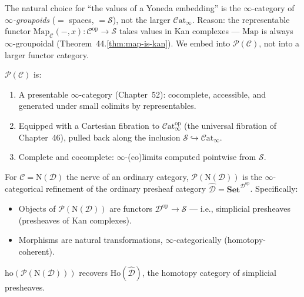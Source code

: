 \begin{remark}
\label{rem:why-spaces}
The natural choice for ``the values of a Yoneda embedding'' is the
$\infty$-category of \emph{$\infty$-groupoids} ($=$ spaces, $=
\mathcal{S}$), not the larger $\mathcal{C}\mathrm{at}_\infty$. Reason:
the representable functor $\mathrm{Map}_\mathcal{C}(-, x) :
\mathcal{C}^{\mathrm{op}} \to \mathcal{S}$ takes values in Kan complexes
— $\mathrm{Map}$ is always $\infty$-groupoidal (Theorem~44.\ref{thm:map-is-kan}).
We embed into $\mathcal{P}(\mathcal{C})$, not into a larger functor
category.
\end{remark}

\begin{theorem}
\label{thm:presheaves-properties}
$\mathcal{P}(\mathcal{C})$ is:
\begin{enumerate}
  \item A presentable $\infty$-category (Chapter~52): cocomplete,
        accessible, and generated under small colimits by representables.
  \item Equipped with a Cartesian fibration to $\mathcal{C}\mathrm{at}_\infty^{\mathrm{op}}$
        (the universal fibration of Chapter~46), pulled back along the
        inclusion $\mathcal{S} \hookrightarrow \mathcal{C}\mathrm{at}_\infty$.
  \item Complete and cocomplete: $\infty$-(co)limits computed pointwise
        from $\mathcal{S}$.
\end{enumerate}
\end{theorem}

\begin{example_thm}
\label{ex:presheaves-1cat}
For $\mathcal{C} = \mathrm{N}(\mathcal{D})$ the nerve of an ordinary
category, $\mathcal{P}(\mathrm{N}(\mathcal{D}))$ is the
$\infty$-categorical refinement of the ordinary presheaf category
$\widehat{\mathcal{D}} = \mathbf{Set}^{\mathcal{D}^{\mathrm{op}}}$.
Specifically:
\begin{itemize}
  \item Objects of $\mathcal{P}(\mathrm{N}(\mathcal{D}))$ are functors
        $\mathcal{D}^{\mathrm{op}} \to \mathcal{S}$ — i.e., simplicial
        presheaves (presheaves of Kan complexes).
  \item Morphisms are natural transformations, $\infty$-categorically
        (homotopy-coherent).
\end{itemize}
$\mathrm{ho}(\mathcal{P}(\mathrm{N}(\mathcal{D})))$ recovers
$\mathrm{Ho}(\widehat{\mathcal{D}})$, the homotopy category of simplicial
presheaves.
\end{example_thm}



